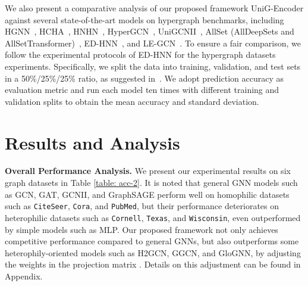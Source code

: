 \documentclass[review]{elsarticle}
\begin{document}
We also present a comparative analysis of our proposed framework UniG-Encoder against several state-of-the-art models on hypergraph benchmarks, including HGNN~\cite{feng2019hypergraph}, HCHA~\cite{bai2021hypergraph}, HNHN~\cite{dong2020hnhn}, HyperGCN~\cite{yadati2019hypergcn}, UniGCNII~\cite{huang2021unignn}, AllSet (AllDeepSets and AllSetTransformer)~\cite{chien2021you}, ED-HNN~\cite{wang2022equivariant}, and LE-GCN~\cite{yang2022semi}. To ensure a fair comparison, we follow the experimental protocols of ED-HNN for the hypergraph datasets experiments. Specifically, we split the data into training, validation, and test sets in a 50\%/25\%/25\% ratio, as suggested in~\cite{chien2021you}. We adopt prediction accuracy as evaluation metric and run each model ten times with different training and validation splits to obtain the mean accuracy and standard deviation.

\section{Results and Analysis}

\textbf{Overall Performance Analysis.} We present our experimental results on six graph datasets in Table \ref{table: acc-2}. It is noted that general GNN models such as GCN, GAT, GCNII, and GraphSAGE perform well on homophilic datasets such as \texttt{CiteSeer}, \texttt{Cora}, and \texttt{PubMed}, but their performance deteriorates on heterophilic datasets such as \texttt{Cornell}, \texttt{Texas}, and \texttt{Wisconsin}, even outperformed by simple models such as MLP. Our proposed framework not only achieves competitive performance compared to general GNNs, but also outperforms some heterophily-oriented models such as H2GCN, GGCN, and GloGNN, by adjusting the weights in the projection matrix . Details on this adjustment can be found in Appendix.
\end{document}
